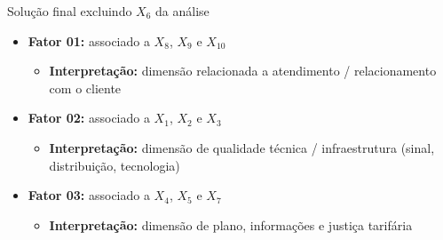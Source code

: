 \documentclass[
  ignorenonframetext,
  aspectratio=169,
]{beamer}
\providecommand{\tightlist}{%
  \setlength{\itemsep}{0pt}\setlength{\parskip}{0pt}}
\begin{document}
\begin{frame}{Solução final excluindo \(X_6\) da análise}
\label{soluuxe7uxe3o-final-excluindo-x_6-da-anuxe1lise}
\begin{itemize}
\tightlist
\item
  \textbf{Fator 01:} associado a \(X_8\), \(X_9\) e \(X_{10}\)

  \begin{itemize}
  \tightlist
  \item
    \textbf{Interpretação:} dimensão relacionada a atendimento /
    relacionamento com o cliente
  \end{itemize}
\item
  \textbf{Fator 02:} associado a \(X_1\), \(X_2\) e \(X_3\)

  \begin{itemize}
  \tightlist
  \item
    \textbf{Interpretação:} dimensão de qualidade técnica /
    infraestrutura (sinal, distribuição, tecnologia)
  \end{itemize}
\item
  \textbf{Fator 03:} associado a \(X_4\), \(X_5\) e \(X_7\)

  \begin{itemize}
  \tightlist
  \item
    \textbf{Interpretação:} dimensão de plano, informações e justiça
    tarifária
  \end{itemize}
\end{itemize}
\end{frame}
\end{document}
